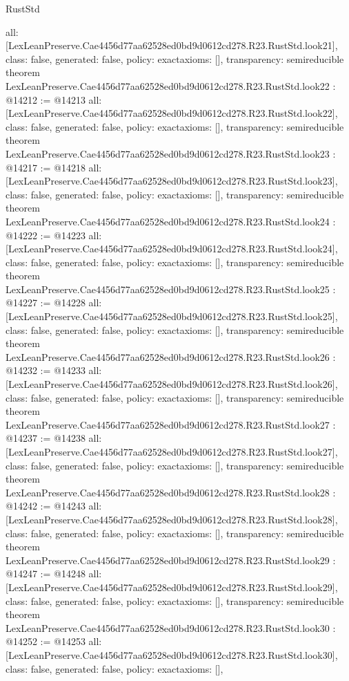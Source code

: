 \begin{lexlean}{RustStd}
\begin{coremodule}
{  all: [LexLeanPreserve.Cae4456d77aa62528ed0bd9d0612cd278.R23.RustStd.look21],
  class: false,
  generated: false,
  policy: exact{axioms: []},
  transparency: semireducible
}
theorem LexLeanPreserve.Cae4456d77aa62528ed0bd9d0612cd278.R23.RustStd.look22 : @14212 := @14213 {
  all: [LexLeanPreserve.Cae4456d77aa62528ed0bd9d0612cd278.R23.RustStd.look22],
  class: false,
  generated: false,
  policy: exact{axioms: []},
  transparency: semireducible
}
theorem LexLeanPreserve.Cae4456d77aa62528ed0bd9d0612cd278.R23.RustStd.look23 : @14217 := @14218 {
  all: [LexLeanPreserve.Cae4456d77aa62528ed0bd9d0612cd278.R23.RustStd.look23],
  class: false,
  generated: false,
  policy: exact{axioms: []},
  transparency: semireducible
}
theorem LexLeanPreserve.Cae4456d77aa62528ed0bd9d0612cd278.R23.RustStd.look24 : @14222 := @14223 {
  all: [LexLeanPreserve.Cae4456d77aa62528ed0bd9d0612cd278.R23.RustStd.look24],
  class: false,
  generated: false,
  policy: exact{axioms: []},
  transparency: semireducible
}
theorem LexLeanPreserve.Cae4456d77aa62528ed0bd9d0612cd278.R23.RustStd.look25 : @14227 := @14228 {
  all: [LexLeanPreserve.Cae4456d77aa62528ed0bd9d0612cd278.R23.RustStd.look25],
  class: false,
  generated: false,
  policy: exact{axioms: []},
  transparency: semireducible
}
theorem LexLeanPreserve.Cae4456d77aa62528ed0bd9d0612cd278.R23.RustStd.look26 : @14232 := @14233 {
  all: [LexLeanPreserve.Cae4456d77aa62528ed0bd9d0612cd278.R23.RustStd.look26],
  class: false,
  generated: false,
  policy: exact{axioms: []},
  transparency: semireducible
}
theorem LexLeanPreserve.Cae4456d77aa62528ed0bd9d0612cd278.R23.RustStd.look27 : @14237 := @14238 {
  all: [LexLeanPreserve.Cae4456d77aa62528ed0bd9d0612cd278.R23.RustStd.look27],
  class: false,
  generated: false,
  policy: exact{axioms: []},
  transparency: semireducible
}
theorem LexLeanPreserve.Cae4456d77aa62528ed0bd9d0612cd278.R23.RustStd.look28 : @14242 := @14243 {
  all: [LexLeanPreserve.Cae4456d77aa62528ed0bd9d0612cd278.R23.RustStd.look28],
  class: false,
  generated: false,
  policy: exact{axioms: []},
  transparency: semireducible
}
theorem LexLeanPreserve.Cae4456d77aa62528ed0bd9d0612cd278.R23.RustStd.look29 : @14247 := @14248 {
  all: [LexLeanPreserve.Cae4456d77aa62528ed0bd9d0612cd278.R23.RustStd.look29],
  class: false,
  generated: false,
  policy: exact{axioms: []},
  transparency: semireducible
}
theorem LexLeanPreserve.Cae4456d77aa62528ed0bd9d0612cd278.R23.RustStd.look30 : @14252 := @14253 {
  all: [LexLeanPreserve.Cae4456d77aa62528ed0bd9d0612cd278.R23.RustStd.look30],
  class: false,
  generated: false,
  policy: exact{axioms: []},
}
\end{coremodule}
\end{lexlean}
